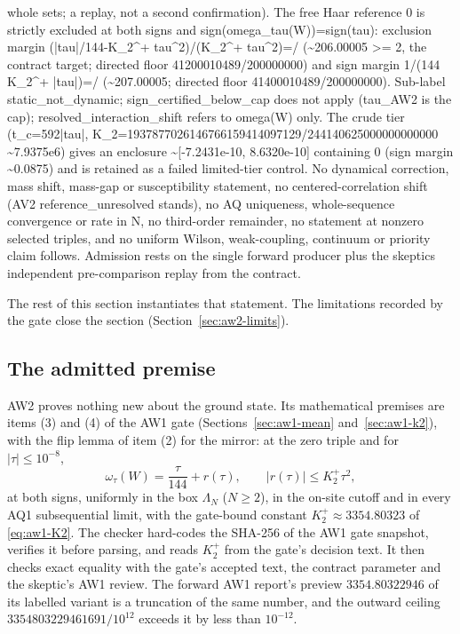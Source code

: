 \begin{gatequote}
whole sets; a replay, not a second confirmation). The free Haar reference 0 is
strictly excluded at both signs and sign(omega\_tau(W))=sign(tau): exclusion
margin (|tau|/144-K\_2\textasciicircum{}+
tau\textasciicircum{}2)/(K\_2\textasciicircum{}+
tau\textasciicircum{}2)=/
(\textasciitilde{}206.00005 >= 2, the contract target; directed floor
41200010489/200000000) and sign margin 1/(144 K\_2\textasciicircum{}+
|tau|)=/
(\textasciitilde{}207.00005; directed floor 41400010489/200000000). Sub-label
static\_not\_dynamic; sign\_certified\_below\_cap does not apply (tau\_AW2 is
the cap); resolved\_interaction\_shift refers to omega(W) only. The crude tier
(t\_c=592|tau|, K\_2=1937877026146766159414097129/244140625000000000000
\textasciitilde{}7.9375e6) gives an enclosure \textasciitilde{}[-7.2431e-10,
8.6320e-10] containing 0 (sign margin \textasciitilde{}0.0875) and is retained
as a failed limited-tier control. No dynamical correction, mass shift,
mass-gap or susceptibility statement, no centered-correlation shift (AV2
reference\_unresolved stands), no AQ uniqueness, whole-sequence convergence or
rate in N, no third-order remainder, no statement at nonzero selected triples,
and no uniform Wilson, weak-coupling, continuum or priority claim follows.
Admission rests on the single forward producer plus the
skeptic\textquotesingle{}s independent pre-comparison replay from the
contract.
\end{gatequote}
The rest of this section instantiates that statement. The limitations
recorded by the gate close the section (Section~\ref{sec:aw2-limits}).

\subsection{The admitted premise}
\label{sec:aw2-premise}
AW2 proves nothing new about the ground state. Its mathematical premises are
items (3) and (4) of the AW1 gate (Sections~\ref{sec:aw1-mean}
and~\ref{sec:aw1-k2}), with the flip lemma of item (2) for the mirror: at the
zero triple and for $|\tau|\le10^{-8}$,
\begin{equation}
 \omega_\tau(W)=\frac{\tau}{144}+r(\tau),\qquad |r(\tau)|\le K_2^+\tau^2 ,
 \label{eq:aw2-premise}
\end{equation}
at both signs, uniformly in the box $\Lambda_N$ ($N\ge2$), in the on-site
cutoff and in every AQ1 subsequential limit, with the gate-bound constant
$K_2^+\approx3354.80323$ of \eqref{eq:aw1-K2}. The checker hard-codes the
SHA-256 of the AW1 gate snapshot, verifies it before parsing, and reads
$K_2^+$ from the gate's decision text. It then checks exact equality with the
gate's accepted text, the contract parameter and the skeptic's AW1 review. The
forward AW1 report's preview $3354.80322946$ of its labelled
 variant is a truncation of the same number, and the
outward ceiling $3354803229461691/10^{12}$ exceeds it by less than
$10^{-12}$.


